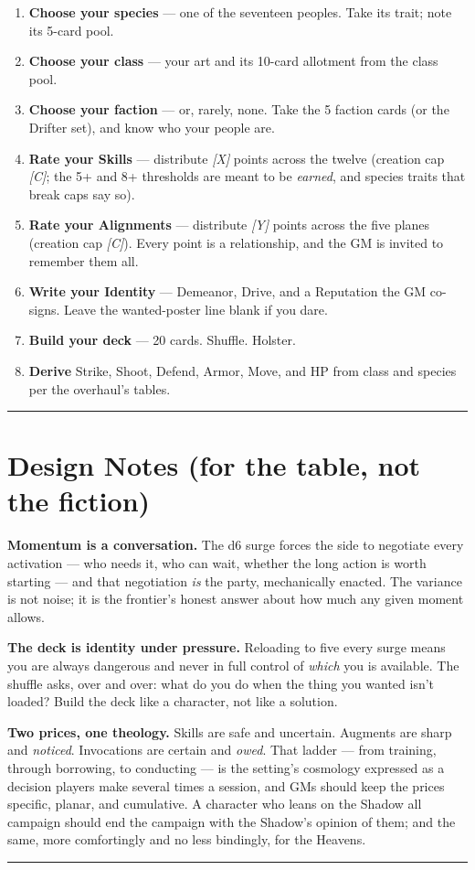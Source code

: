 \begin{enumerate}
    \item \textbf{Choose your species} --- one of the seventeen peoples. Take its trait; note its 5-card pool.
    \item \textbf{Choose your class} --- your art and its 10-card allotment from the class pool.
    \item \textbf{Choose your faction} --- or, rarely, none. Take the 5 faction cards (or the Drifter set), and know who your people are.
    \item \textbf{Rate your Skills} --- distribute \textit{[X]} points across the twelve (creation cap \textit{[C]}; the 5+ and 8+ thresholds are meant to be \textit{earned}, and species traits that break caps say so).
    \item \textbf{Rate your Alignments} --- distribute \textit{[Y]} points across the five planes (creation cap \textit{[C]}). Every point is a relationship, and the GM is invited to remember them all.
    \item \textbf{Write your Identity} --- Demeanor, Drive, and a Reputation the GM co-signs. Leave the wanted-poster line blank if you dare.
    \item \textbf{Build your deck} --- 20 cards. Shuffle. Holster.
    \item \textbf{Derive} Strike, Shoot, Defend, Armor, Move, and HP from class and species per the overhaul's tables.
\end{enumerate}

\medskip\hrule\medskip

\section{Design Notes (for the table, not the fiction)}

\textbf{Momentum is a conversation.} The d6 surge forces the side to negotiate every activation --- who needs it, who can wait, whether the long action is worth starting --- and that negotiation \textit{is} the party, mechanically enacted. The variance is not noise; it is the frontier's honest answer about how much any given moment allows.

\textbf{The deck is identity under pressure.} Reloading to five every surge means you are always dangerous and never in full control of \textit{which} you is available. The shuffle asks, over and over: what do you do when the thing you wanted isn't loaded? Build the deck like a character, not like a solution.

\textbf{Two prices, one theology.} Skills are safe and uncertain. Augments are sharp and \textit{noticed}. Invocations are certain and \textit{owed}. That ladder --- from training, through borrowing, to conducting --- is the setting's cosmology expressed as a decision players make several times a session, and GMs should keep the prices specific, planar, and cumulative. A character who leans on the Shadow all campaign should end the campaign with the Shadow's opinion of them; and the same, more comfortingly and no less bindingly, for the Heavens.

\medskip\hrule\medskip
